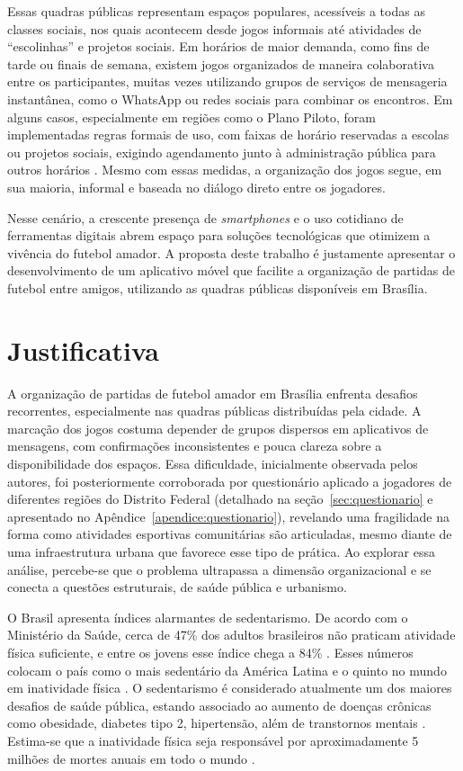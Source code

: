   Essas quadras públicas representam espaços populares, acessíveis a todas as classes sociais, nos quais acontecem desde jogos informais até atividades de “escolinhas” e projetos sociais. Em horários de maior demanda, como fins de tarde ou finais de semana, existem jogos organizados de maneira colaborativa entre os participantes, muitas vezes utilizando grupos de serviços de mensageria instantânea, como o WhatsApp ou redes sociais para combinar os encontros. Em alguns casos, especialmente em regiões como o Plano Piloto, foram implementadas regras formais de uso, com faixas de horário reservadas a escolas ou projetos sociais, exigindo agendamento junto à administração pública para outros horários \cite{peixoto2025}. Mesmo com essas medidas, a organização dos jogos segue, em sua maioria, informal e baseada no diálogo direto entre os jogadores.

  Nesse cenário, a crescente presença de \textit{smartphones} e o uso cotidiano de ferramentas digitais abrem espaço para soluções tecnológicas que otimizem a vivência do futebol amador. A proposta deste trabalho é justamente apresentar o desenvolvimento de um aplicativo móvel que facilite a organização de partidas de futebol entre amigos, utilizando as quadras públicas disponíveis em Brasília.

\section{Justificativa}

  A organização de partidas de futebol amador em Brasília enfrenta desafios recorrentes, especialmente nas quadras públicas distribuídas pela cidade. A marcação dos jogos costuma depender de grupos dispersos em aplicativos de mensagens, com confirmações inconsistentes e pouca clareza sobre a disponibilidade dos espaços. Essa dificuldade, inicialmente observada pelos autores, foi posteriormente corroborada por questionário aplicado a jogadores de diferentes regiões do Distrito Federal (detalhado na seção~\ref{sec:questionario} e apresentado no Apêndice~\ref{apendice:questionario}), revelando uma fragilidade na forma como atividades esportivas comunitárias são articuladas, mesmo diante de uma infraestrutura urbana que favorece esse tipo de prática. Ao explorar essa análise, percebe-se que o problema ultrapassa a dimensão organizacional e se conecta a questões estruturais, de saúde pública e urbanismo.

  O Brasil apresenta índices alarmantes de sedentarismo. De acordo com o Ministério da Saúde, cerca de 47\% dos adultos brasileiros não praticam atividade física suficiente, e entre os jovens esse índice chega a 84\% \cite{ministerio2023,saraiva2024}. Esses números colocam o país como o mais sedentário da América Latina e o quinto no mundo em inatividade física \cite{oms2023,bvsms2023}. O sedentarismo é considerado atualmente um dos maiores desafios de saúde pública, estando associado ao aumento de doenças crônicas como obesidade, diabetes tipo 2, hipertensão, além de transtornos mentais \cite{bvsms2023,oms2023}. Estima-se que a inatividade física seja responsável por aproximadamente 5 milhões de mortes anuais em todo o mundo \cite{oms2023}.

